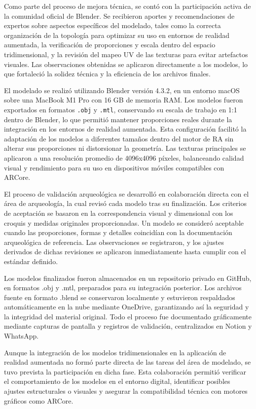 Como parte del proceso de mejora técnica, se contó con la participación activa de la comunidad oficial de Blender. Se recibieron aportes y recomendaciones de expertos sobre aspectos específicos del modelado, tales como la correcta organización de la topología para optimizar su uso en entornos de realidad aumentada, la verificación de proporciones y escala dentro del espacio tridimensional, y la revisión del mapeo UV de las texturas para evitar artefactos visuales. Las observaciones obtenidas se aplicaron directamente a los modelos, lo que fortaleció la solidez técnica y la eficiencia de los archivos finales. 

El modelado se realizó utilizando Blender versión 4.3.2, en un entorno macOS sobre una MacBook M1 Pro con 16 GB de memoria RAM. Los modelos fueron exportados en formatos \texttt{.obj} y \texttt{.mtl}, conservando su escala de trabajo en 1:1 dentro de Blender, lo que permitió mantener proporciones reales durante la integración en los entornos de realidad aumentada. Esta configuración facilitó la adaptación de los modelos a diferentes tamaños dentro del motor de RA sin alterar sus proporciones ni distorsionar la geometría. Las texturas principales se aplicaron a una resolución promedio de 4096x4096 píxeles, balanceando calidad visual y rendimiento para su uso en dispositivos móviles compatibles con \gls{ARCore}.

El proceso de validación arqueológica se desarrolló en colaboración directa con el área de arqueología, la cual revisó cada modelo tras su finalización. Los criterios de aceptación se basaron en la correspondencia visual y dimensional con los croquis y medidas originales proporcionadas. Un modelo se consideró aceptable cuando las proporciones, formas y detalles coincidían con la documentación arqueológica de referencia. Las observaciones se registraron, y los ajustes derivados de dichas revisiones se aplicaron inmediatamente hasta cumplir con el estándar definido.

Los modelos finalizados fueron almacenados en un repositorio privado en GitHub, en formatos .obj y .mtl, preparados para su integración posterior. Los archivos fuente en formato .blend se conservaron localmente y estuvieron respaldados automáticamente en la nube mediante OneDrive, garantizando así la seguridad y la integridad del material original. Todo el proceso fue documentado gráficamente mediante capturas de pantalla y registros de validación, centralizados en Notion y WhatsApp.

Aunque la integración de los modelos tridimensionales en la aplicación de realidad aumentada no formó parte directa de las tareas del área de modelado, se tuvo prevista la participación en dicha fase. Esta colaboración permitió verificar el comportamiento de los modelos en el entorno digital, identificar posibles ajustes estructurales o visuales y asegurar la compatibilidad técnica con motores gráficos como \gls{ARCore}.

